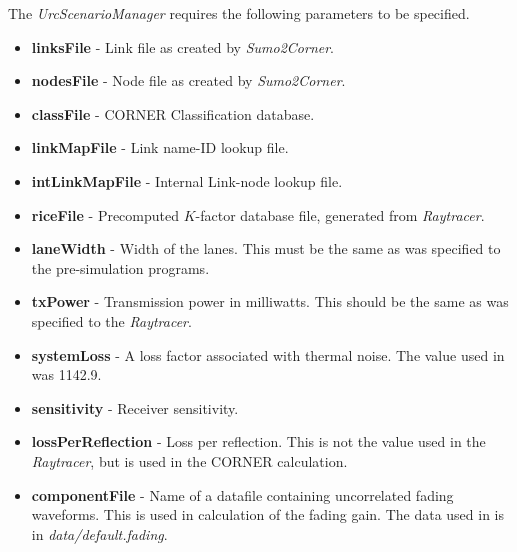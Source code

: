 The \textit{UrcScenarioManager} requires the following parameters to be specified.
\begin{itemize}
 \item \textbf{linksFile} - Link file as created by \textit{Sumo2Corner}. 
 \item \textbf{nodesFile} - Node file as created by \textit{Sumo2Corner}. 
 \item \textbf{classFile} - CORNER Classification database.
 \item \textbf{linkMapFile} - Link name-ID lookup file.
 \item \textbf{intLinkMapFile} - Internal Link-node lookup file. 
 \item \textbf{riceFile} - Precomputed $K$-factor database file, generated from \textit{Raytracer}.
 \item \textbf{laneWidth} - Width of the lanes. This must be the same as was specified to the pre-simulation programs.
 \item \textbf{txPower} - Transmission power in milliwatts. This should be the same as was specified to the \textit{Raytracer}.
 \item \textbf{systemLoss} - A loss factor associated with thermal noise. The value used in \cite{mukunthan_experimental_2013,cooper_dynamic_2014} was 1142.9.
 \item \textbf{sensitivity} - Receiver sensitivity.
 \item \textbf{lossPerReflection} - Loss per reflection. This is not the value used in the \textit{Raytracer}, but is used in the CORNER calculation.
 \item \textbf{componentFile} - Name of a datafile containing uncorrelated fading waveforms. This is used in calculation of the fading gain. The data used in \cite{mukunthan_experimental_2013,cooper_dynamic_2014} is in \textit{data/default.fading}.
\end{itemize}

